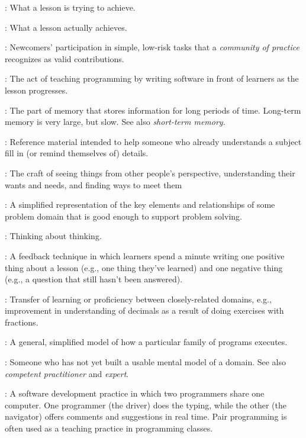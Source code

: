 \begin{description}
: What a lesson is trying to
achieve.

: What a lesson actually achieves.

: Newcomers' participation in simple, low-risk tasks that a
\emph{community of practice} recognizes as valid contributions.

: The act of teaching programming by writing
software in front of learners as the lesson progresses.

: The part of memory that stores
information for long periods of time. Long-term memory is very large, but
slow. See also \emph{short-term memory}.

: Reference material intended to help someone who
already understands a subject fill in (or remind themselves of) details.

: The craft of seeing things from other people's
perspective, understanding their wants and needs, and finding ways to meet them

: A simplified representation of the key
elements and relationships of some problem domain that is good enough to support
problem solving.

: Thinking about thinking.

: A feedback technique in which learners
spend a minute writing one positive thing about a lesson (e.g., one thing
they've learned) and one negative thing (e.g., a question that still hasn't been
answered).

: Transfer of learning or proficiency
between closely-related domains, e.g., improvement in understanding of decimals
as a result of doing exercises with fractions.

: A general, simplified model of how
a particular family of programs executes.

: Someone who has not yet built a usable mental model of
a domain. See also \emph{competent practitioner} and \emph{expert}.

: A software development practice in
which two programmers share one computer. One programmer (the driver) does the
typing, while the other (the navigator) offers comments and suggestions in real
time. Pair programming is often used as a teaching practice in programming
classes.


\end{description}
